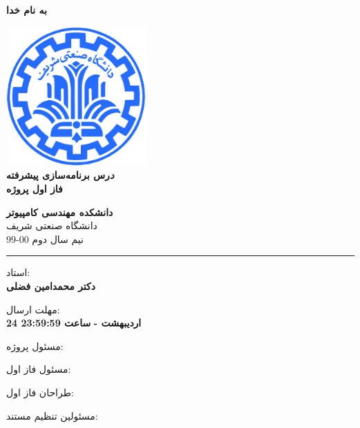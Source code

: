 \documentclass[]{article}
\begin{document}
\begin{titlepage}
\begin{center}

\textbf{ \Huge{به نام خدا} }
        
\vspace{0.2cm}

\includegraphics[width=0.4\textwidth]{sharif1.png}\\
\vspace{0.2cm}
\textbf{ \Huge{\emph درس برنامه‌سازی پیشرفته} }\\
\vspace{0.25cm}
\textbf{ \Large{ فاز اول پروژه} }
\vspace{0.2cm}
       
 
      \large \textbf{دانشکده مهندسی کامپیوتر}\\\vspace{0.1cm}
    \large   دانشگاه صنعتی شریف\\\vspace{0.2cm}
       \large   ﻧﯿﻢ سال دوم 00-99 \\\vspace{0.10cm}
      \noindent\rule[1ex]{\linewidth}{1pt}
استاد:\\
    \textbf{{دکتر محمدامین فضلی}}



    \vspace{0.20cm}

   مهلت ارسال:\\
    \textbf{{24 اردیبهشت - }}
    \textbf{{ساعت 23:59:59}}

    \vspace{0.10cm}
مسئول پروژه:\\
    \textbf{}
    
        \vspace{0.10cm}
مسئول فاز اول:\\
    \textbf{}
    
        \vspace{0.10cm}
طراحان فاز اول:\\
    \textbf{}
    
        \vspace{0.05cm}
مسئولین تنظیم مستند:\\
    \textbf{}
    

\end{center}
\end{titlepage}
\end{document}
